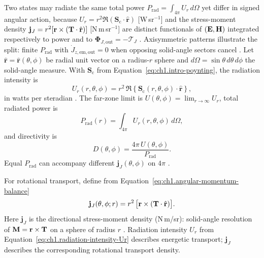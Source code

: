 Two states may radiate the same total power $P_{\mathrm{rad}}=\int_{4\pi}U_r\,d\Omega$ yet differ in signed angular action, because $U_r=r^2\Re(\mathbf{S}_\mathrm{c}\cdot\hat{\mathbf{r}})$ [W\,sr$^{-1}$] and the stress-moment density $\mathbf{j}_J=r^2[\mathbf{r}\times(\mathbf{T}\cdot\hat{\mathbf{r}})]$ [N\,m\,sr$^{-1}$] are distinct functionals of $(\mathbf{E},\mathbf{H})$ integrated respectively to power and to $\boldsymbol{\Phi}_{J,\mathrm{out}}=-\boldsymbol{\mathcal{T}}_J$ \cite{poynting1884,beth1936,stratton1941}. Axisymmetric patterns illustrate the split: finite $P_{\mathrm{rad}}$ with $\dot J_{z,\mathrm{em,out}}=0$ when opposing solid-angle sectors cancel \cite{stratton1941}. Let \(\hat{\mathbf{r}}=\hat{\mathbf{r}}(\theta,\phi)\) be radial unit vector on a
radius-\(r\) sphere and \(d\Omega=\sin\theta\,d\theta\,d\phi\) the solid-angle
measure. With \(\mathbf{S}_\mathrm{c}\) from Equation~\eqref{eq:ch1.intro-poynting}, the radiation intensity is
\begin{equation}
\label{eq:ch1.radiation-intensity-Ur}
U_r(r,\theta,\phi)=
r^2\,\Re\!\left\{\mathbf{S}_\mathrm{c}(r,\theta,\phi)\cdot\hat{\mathbf{r}}\right\},
\end{equation}
in watts per steradian \cite{poynting1884,harrington2001}. The far-zone limit is $U(\theta,\phi)=\lim_{r\to\infty}U_r$, total radiated power is
\begin{equation}
\label{eq:ch1.directional-power-integral}
P_{\mathrm{rad}}(r)=\int_{4\pi}U_r(r,\theta,\phi)\,d\Omega,
\end{equation}
and directivity is
\begin{equation}
\label{eq:ch1.directivity-definition}
D(\theta,\phi)=\frac{4\pi\,U(\theta,\phi)}{P_{\mathrm{rad}}}.
\end{equation}
Equal $P_{\mathrm{rad}}$ can accompany different $\mathbf{j}_J(\theta,\phi)$ on $4\pi$ \cite{stratton1941}.

For rotational transport, define from
Equation~\eqref{eq:ch1.angular-momentum-balance}
\begin{equation}
\label{eq:ch1.directional-am-flux}
\mathbf{j}_J(\theta,\phi;r)=
r^2\,\big[\mathbf{r}\times(\mathbf{T}\cdot\hat{\mathbf{r}})\big].
\end{equation}
Here $\mathbf{j}_J$ is the directional stress-moment density (N\,m/sr): solid-angle resolution of $\mathbf{M}=\mathbf{r}\times\mathbf{T}$ on a sphere of radius $r$ \cite{beth1936,stratton1941}. Radiation intensity $U_r$ from Equation~\eqref{eq:ch1.radiation-intensity-Ur} describes energetic transport; $\mathbf{j}_J$ describes the corresponding rotational transport density.

